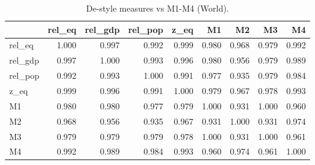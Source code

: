 \begin{table}

\caption{\label{tab:tab:de_vs_m1m4}De-style measures vs M1-M4 (World).}
\centering
\begin{tabular}[t]{lrrrrrrrr}
\toprule
  & rel\_eq & rel\_gdp & rel\_pop & z\_eq & M1 & M2 & M3 & M4\\
\midrule
rel\_eq & 1.000 & 0.997 & 0.992 & 0.999 & 0.980 & 0.968 & 0.979 & 0.992\\
rel\_gdp & 0.997 & 1.000 & 0.993 & 0.996 & 0.980 & 0.956 & 0.979 & 0.989\\
rel\_pop & 0.992 & 0.993 & 1.000 & 0.991 & 0.977 & 0.935 & 0.979 & 0.984\\
z\_eq & 0.999 & 0.996 & 0.991 & 1.000 & 0.979 & 0.967 & 0.978 & 0.993\\
M1 & 0.980 & 0.980 & 0.977 & 0.979 & 1.000 & 0.931 & 1.000 & 0.960\\
\addlinespace
M2 & 0.968 & 0.956 & 0.935 & 0.967 & 0.931 & 1.000 & 0.931 & 0.974\\
M3 & 0.979 & 0.979 & 0.979 & 0.978 & 1.000 & 0.931 & 1.000 & 0.961\\
M4 & 0.992 & 0.989 & 0.984 & 0.993 & 0.960 & 0.974 & 0.961 & 1.000\\
\bottomrule
\end{tabular}
\end{table}
